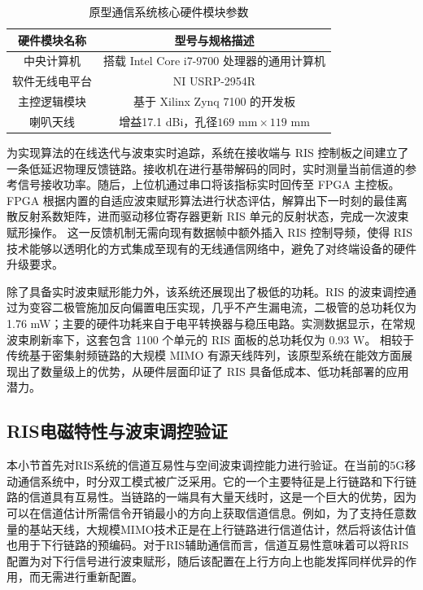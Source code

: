 \begin{table}[!htbp]
	\centering
	\caption{原型通信系统核心硬件模块参数}
	\label{tab:ris_hardware_specs}
	\begin{tabular}{cc}
		\toprule
		\textbf{硬件模块名称} & \textbf{型号与规格描述} \\
		\midrule
		中央计算机 & 搭载 Intel Core i7-9700 处理器的通用计算机 \\
		软件无线电平台 & NI USRP-2954R \\
		主控逻辑模块 & 基于 Xilinx Zynq 7100 的开发板 \\
		喇叭天线 & 增益17.1 dBi，孔径$169 \text{ mm} \times 119 \text{ mm}$ \\
		\bottomrule
	\end{tabular}
\end{table}

为实现算法的在线迭代与波束实时追踪，系统在接收端与 RIS 控制板之间建立了一条低延迟物理反馈链路。接收机在进行基带解码的同时，实时测量当前信道的参考信号接收功率。随后，上位机通过串口将该指标实时回传至 FPGA 主控板。
FPGA 根据内置的自适应波束赋形算法进行状态评估，解算出下一时刻的最佳离散反射系数矩阵，进而驱动移位寄存器更新 RIS 单元的反射状态，完成一次波束赋形操作。
这一反馈机制无需向现有数据帧中额外插入 RIS 控制导频，使得 RIS 技术能够以透明化的方式集成至现有的无线通信网络中，避免了对终端设备的硬件升级要求。

除了具备实时波束赋形能力外，该系统还展现出了极低的功耗。RIS 的波束调控通过为变容二极管施加反向偏置电压实现，几乎不产生漏电流，二极管的总功耗仅为1.76 mW；主要的硬件功耗来自于电平转换器与稳压电路。实测数据显示，在常规波束刷新率下，这套包含 1100 个单元的 RIS 面板的总功耗仅为 0.93 W。
相较于传统基于密集射频链路的大规模 MIMO 有源天线阵列，该原型系统在能效方面展现出了数量级上的优势，从硬件层面印证了 RIS 具备低成本、低功耗部署的应用潜力。


\subsection{RIS电磁特性与波束调控验证}

本小节首先对RIS系统的信道互易性与空间波束调控能力进行验证。在当前的5G移动通信系统中，时分双工模式被广泛采用。它的一个主要特征是上行链路和下行链路的信道具有互易性。当链路的一端具有大量天线时，这是一个巨大的优势，因为可以在信道估计所需信令开销最小的方向上获取信道信息。例如，为了支持任意数量的基站天线，大规模MIMO技术正是在上行链路进行信道估计，然后将该估计值也用于下行链路的预编码。对于RIS辅助通信而言，信道互易性意味着可以将RIS配置为对下行信号进行波束赋形，随后该配置在上行方向上也能发挥同样优异的作用，而无需进行重新配置。

